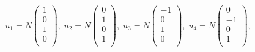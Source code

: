 \documentclass[11pt]{article}
\theoremstyle{definition}
\begin{document}
\begin{align}
    u_1 =  N\begin{pmatrix}
        1\\
        0\\
        1\\
        0\\
    \end{pmatrix},\;
    u_2 = N\begin{pmatrix}
        0\\
        1\\
        0\\
        1\\
    \end{pmatrix},\;
    u_3 = N\begin{pmatrix}
        -1\\
        0\\
        1\\
        0\\
    \end{pmatrix},\;
    u_4 = N\begin{pmatrix}
        0\\
        -1\\
        0\\
        1\\
    \end{pmatrix},\;
\end{align}
\end{document}
